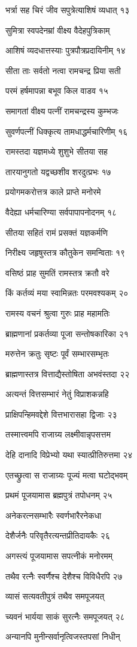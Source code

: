 भर्त्रा सह चिरं जीव सपुत्रेत्याशिषं व्यधात् १३

सुमित्रा स्वपदेनम्रां वीक्ष्य वैदेहपुत्रिकाम्

आशिषं व्यदधात्तस्याः पुत्रपौत्रप्रदायिनीम् १४

सीता ताः सर्वतो नत्वा रामचन्द्र प्रिया सती

परमं हर्षमापन्ना बभूव किल वाडव १५

समागतां वीक्ष्य पत्नीं रामचन्द्रस्य कुम्भजः

सुवर्णपत्नीं धिक्कृत्य तामधाद्धर्मचारिणीम् १६

रामस्तदा यज्ञमध्ये शुशुभे सीतया सह

तारयानुगतो यद्वच्छशीव शरदुत्प्रभः १७

प्रयोगमकरोत्तत्र काले प्राप्ते मनोरमे

वैदेह्या धर्मचारिण्या सर्वपापापनोदनम् १८

सीतया सहितं रामं प्रसक्तं यज्ञकर्मणि

निरीक्ष्य जहृषुस्तत्र कौतुकेन समन्विताः १९

वसिष्ठं प्राह सुमतिं रामस्तत्र क्रतौ वरे

किं कर्तव्यं मया स्वामिन्नतः परमवश्यकम् २०

रामस्य वचनं श्रुत्वा गुरुः प्राह महामतिः

ब्राह्मणानां प्रकर्तव्या पूजा सन्तोषकारिका २१

मरुत्तेन क्रतुः सृष्टः पूर्वं सम्भारसम्भृतः

ब्राह्मणास्तत्र वित्ताद्यैस्तोषिता अभवंस्तदा २२

अत्यन्तं वित्तसम्भारं नेतुं विप्राशकन्नहि

प्राक्षिपन्हिमवद्देशे वित्तभारासहा द्विजाः २३

तस्मात्त्वमपि राजाग्र्य लक्ष्मीवान्नृपसत्तम

देहि दानादि विप्रेभ्यो यथा स्यात्प्रीतिरुत्तमा २४

एतच्छ्रुत्वा स राजाग्र्यः पूज्यं मत्वा घटोद्भवम्

प्रथमं पूजयामास ब्रह्मपुत्रं तपोधनम् २५

अनेकरत्नसम्भारैः स्वर्णभारैरनेकधा

देशैर्जनैः परिवृतैरत्यन्तप्रीतिदायकैः २६

अगस्त्यं पूजयामास सपत्नीकं मनोरमम्

तथैव रत्नैः स्वर्णैश्च देशैश्च विविधैरपि २७

व्यासं सत्यवतीपुत्रं तथैव समपूजयत्

च्यवनं भार्यया साकं सुरत्नैः समपूजयत् २८

अन्यानपि मुनीन्सर्वानृत्विजस्तपसां निधीन्

